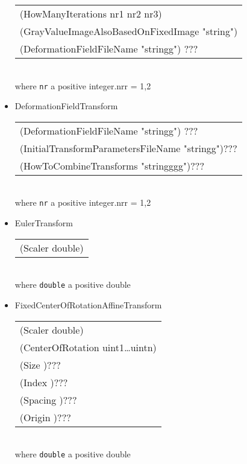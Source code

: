 \documentclass[a4paper]{article}
\newenvironment{Tabular}[1]{\ttfamily \begin{tabular}{#1}}{\end{tabular}}
\begin{document}
\begin{description}
\begin{itemize}
\begin{Tabular}{l}
        (HowManyIterations nr1 nr2 nr3) \\
        (GrayValueImageAlsoBasedOnFixedImage "string") \\
        (DeformationFieldFileName "stringg") ???
        \end{Tabular}\\
    where \texttt{nr} a positive integer.nrr = 1,2
    \item DeformationFieldTransform\\
        \begin{Tabular}{l}
        (DeformationFieldFileName "stringg") ???\\
        (InitialTransformParametersFileName "stringg")??? \\
        (HowToCombineTransforms "stringggg")???
        \end{Tabular}\\
    where \texttt{nr} a positive integer.nrr = 1,2
    \item EulerTransform\\
        \begin{Tabular}{l}
        (Scaler double)
        \end{Tabular}\\
    where \texttt{double} a positive double
    \item FixedCenterOfRotationAffineTransform\\
        \begin{Tabular}{l}
        (Scaler double) \\
        (CenterOfRotation uint1\ldots uintn) \\
        (Size )??? \\
        (Index )??? \\
        (Spacing )??? \\
        (Origin )??? \\
        \end{Tabular}\\
    where \texttt{double} a positive double
    \end{itemize}


\end{description}
\end{document}
